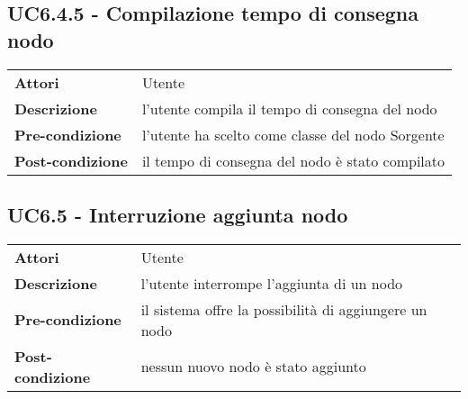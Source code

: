 \subsection{UC6.4.5 - Compilazione tempo di consegna nodo}
\label{sssec:UC6.4.5}
\def\arraystretch{1.5}
\begin{tabularx}{\textwidth}{l|p{}}
\rowcolor{I} \multicolumn{2}{c}{\color{white}\textbf{UC6.4.5 - Compilazione tempo di consegna nodo}} \\
\toprule
\endhead
\textbf{Attori} & Utente\\
\textbf{Descrizione} & l'utente compila il tempo di consegna del nodo\\
\textbf{Pre-condizione} & l'utente ha scelto come classe del nodo Sorgente\\
\textbf{Post-condizione} & il tempo di consegna del nodo è stato compilato\\
\bottomrule
\end{tabularx}
\subsection{UC6.5 - Interruzione aggiunta nodo}
\label{sssec:UC6.5}
\def\arraystretch{1.5}
\begin{tabularx}{\textwidth}{l|p{}}
\rowcolor{I} \multicolumn{2}{c}{\color{white}\textbf{UC6.5 - Interruzione aggiunta nodo}} \\
\toprule
\endhead
\textbf{Attori} & Utente\\
\textbf{Descrizione} & l'utente interrompe l'aggiunta di un nodo\\
\textbf{Pre-condizione} & il sistema offre la possibilità di aggiungere un nodo\\
\textbf{Post-condizione} & nessun nuovo nodo è stato aggiunto\\
\bottomrule
\end{tabularx}
